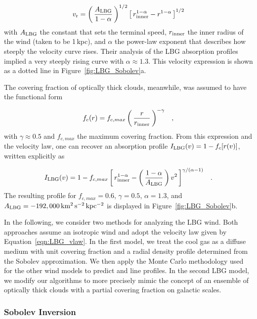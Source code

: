 \documentclass[12pt,preprint]{aastex}
\begin{document}
\begin{equation}
v_{\rm r} = \left ( \, \frac{A_{\rm LBG}}{1-\alpha} \, \right )^{1/2} \left [ \, r_{\rm
  inner}^{1-\alpha} - r^{1-\alpha} \, \right ]^{1/2}
\label{eqn:LBG_vlaw}
\end{equation}
with $A_{\rm LBG}$ the constant that sets the terminal speed,
$r_{\rm inner}$ the inner radius of the wind (taken to be 1\,kpc), and
$\alpha$ the power-law exponent that describes how steeply the velocity curve rises.  Their
analysis of the LBG absorption profiles implied
a very steeply rising curve with $\alpha \approx 1.3$.
This velocity expression is shown as a dotted line in 
Figure~\ref{fig:LBG_Sobolev}a.  

The covering fraction of optically thick clouds, meanwhile, was assumed to have
the functional form

\begin{equation}
f_c(r) = f_{c,max} \left ( \, \frac{r}{r_{\rm inner}} \, \right )^{-\gamma} \;\;\; ,
\label{eqn:covering}
\end{equation}
with $\gamma \approx 0.5$ and $f_{c,max}$ the maximum covering
fraction.  From this expression and the velocity law, one can recover
an absorption profile $I_{\rm LBG}(v) = 1 - f_c[r(v)]$, written
explicitly as

\begin{equation}
I_{\rm LBG}(v) = 1 - f_{c,max} \left [ \, r_{\rm inner}^{1-\alpha} - \left ( \,
\frac{1-\alpha}{A_{\rm LBG}} \, \right ) v^2 \, \right ]^{\gamma/(\alpha-1)}
\;\;\; .
\label{eqn:LBG_I}
\end{equation}
The resulting profile for $f_{c,max} = 0.6$, $\gamma=0.5$,
$\alpha=1.3$, and $A_{\rm LBG} = -192,000 \, \rm km^2 \, s^{-2} \, kpc^{-2}$ 
is displayed in Figure~\ref{fig:LBG_Sobolev}b.  

In the following, we consider two methods for analyzing the LBG wind.
Both approaches assume an isotropic wind and adopt the velocity law given by
Equation~\ref{eqn:LBG_vlaw}.  In the first model, we treat the cool gas as a
diffuse medium with unit covering fraction and a radial density
profile determined from the Sobolev approximation.  We then apply 
the Monte Carlo methodology used for the other wind models to predict
 and  line profiles.  In the second LBG model,
we modify our algorithms to more precisely mimic the concept of an
ensemble of optically thick clouds with a partial covering fraction on
galactic scales.

\subsubsection{Sobolev Inversion}
\label{sec:Sobolev}
\end{document}
